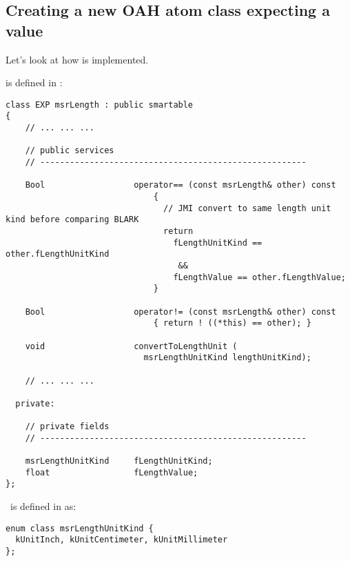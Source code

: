 \subsection{Creating a new OAH atom class expecting a value}

Let's look at how  is implemented.

 is defined in :
\begin{lstlisting}[language=CPlusPlus]
class EXP msrLength : public smartable
{
	// ... ... ...

    // public services
    // ------------------------------------------------------

    Bool                  operator== (const msrLength& other) const
                              {
                                // JMI convert to same length unit kind before comparing BLARK
                                return
                                  fLengthUnitKind == other.fLengthUnitKind
                                   &&
                                  fLengthValue == other.fLengthValue;
                              }

    Bool                  operator!= (const msrLength& other) const
                              { return ! ((*this) == other); }

    void                  convertToLengthUnit (
                            msrLengthUnitKind lengthUnitKind);

	// ... ... ...

  private:

    // private fields
    // ------------------------------------------------------

    msrLengthUnitKind     fLengthUnitKind;
    float                 fLengthValue;
};
\end{lstlisting}

\EnumType\ is defined in  as:
\begin{lstlisting}[language=CPlusPlus]
enum class msrLengthUnitKind {
  kUnitInch, kUnitCentimeter, kUnitMillimeter
};
\end{lstlisting}

